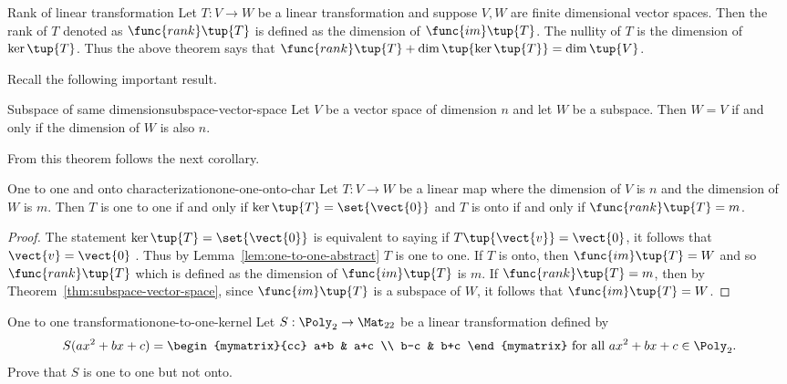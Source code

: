 \begin{definition}{Rank of linear transformation}{}
Let $T:V\rightarrow W$ be a linear transformation and suppose $V,W$ are finite dimensional vector spaces. Then
the rank of $T$ denoted as $\func{rank}\tup{T} $ is defined as the
dimension of $\func{im}\tup{T}$. The nullity of $T$ is the
dimension of $\ker \tup{T}$. Thus the above theorem says that $
\func{rank}\tup{T} +\dim \tup{\ker \tup{T} } =\dim
\tup{V}$.
\end{definition}

Recall the following important result. 

\begin{theorem}{Subspace of same dimension}{subspace-vector-space}
Let $V$ be a vector space of dimension $n$ and let $W$ be a
subspace. Then $W=V$ if and only if the dimension of $W$ is also $n$.
\end{theorem}

From this theorem follows the next corollary.

\begin{corollary}{One to one and onto characterization}{one-one-onto-char}
Let $T:V\rightarrow W$ be a linear map where the dimension of $V$ is $n$ and
the dimension of $W$ is $m$. Then $T$ is one to one if and only if $\ker
\tup{T} =\set{\vect{0}} $ and $T$ is onto if and only if $
\func{rank}\tup{T} =m$.
\end{corollary}

\begin{proof}
The statement $\ker \tup{T } =\set{\vect{0}} $
is equivalent to saying if $T \tup{\vect{v} }=\vect{0}$, it follows that $\vect{v}=\vect{0}$
. Thus by Lemma~\ref{lem:one-to-one-abstract} $T$ is one to one. If $T$ is onto, then $
\func{im}\tup{T} =W$ and so $\func{rank}\tup{T} $ which is
defined as the dimension of $\func{im}\tup{T} $ is $m$. If $\func{
rank}\tup{T} =m$, then by Theorem~\ref{thm:subspace-vector-space}, since $\func{im}
\tup{T} $ is a subspace of $W$, it follows that $\func{im}\tup{
T} =W$. 
\end{proof}

\begin{example}{One to one transformation}{one-to-one-kernel}
Let $S:\Poly_2\to\Mat_{22}$ be a linear transformation
defined by
\[ S(ax^2+bx+c)
=
\begin{mymatrix}{cc}
a+b & a+c \\ b-c & b+c \end{mymatrix}
\mbox{ for all }
 ax^2+bx+c\in \Poly_2.\]
Prove that $S$ is one to one but not onto.
\end{example}

